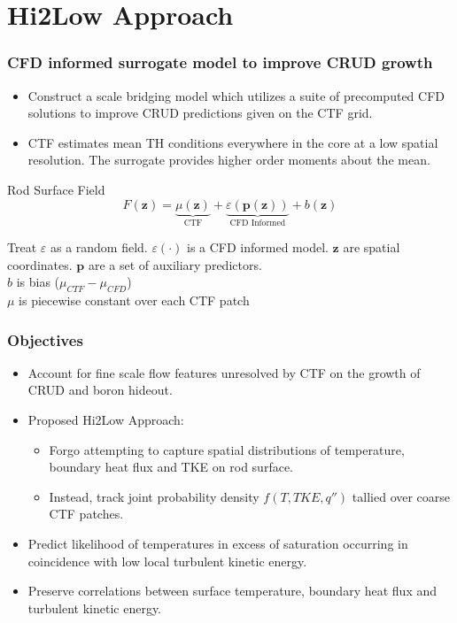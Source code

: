 \documentclass[t, pdftex]{beamer}
\begin{document}
\section{Hi2Low Approach}
\begin{frame}
    \frametitle{CFD informed surrogate model to improve CRUD growth}
    \begin{itemize}
    \item Construct a scale bridging model which utilizes a suite of precomputed CFD solutions to improve CRUD predictions given on the CTF grid. 
    \item CTF estimates mean TH conditions everywhere in the core at a low spatial resolution.  The surrogate provides higher order moments about the mean.
    \end{itemize}
    \begin{block}{Rod Surface Field}
        \[ 
        F(\mathbf z) = \underbrace{\mu(\mathbf{z})}_\text{CTF} + \underbrace{\varepsilon({\mathbf p(\mathbf z)})}_\text{CFD Informed} + b(\mathbf{z})
        \]
    \end{block}
    Treat $\varepsilon$ as a random field.  $\varepsilon(\cdot)$ is a CFD informed model. $\mathbf z$ are spatial coordinates. $\mathbf p$ are a set of auxiliary predictors. \\
    $b$ is bias ($\mu_{CTF} - \mu_{CFD}$) \\
    $\mu$ is piecewise constant over each CTF patch
\end{frame}

\begin{frame}\frametitle{Objectives}
\begin{itemize}
\item Account for fine scale flow features unresolved by CTF on the growth of CRUD and boron hideout.
\item Proposed Hi2Low Approach:
\begin{itemize}
	\item Forgo attempting to capture spatial distributions of temperature, boundary heat flux and TKE on rod surface. 
	\item Instead, track joint probability density $f(T, TKE, q'')$ tallied over coarse CTF patches.
\end{itemize}
	\item Predict likelihood of temperatures in excess of saturation occurring in coincidence with low local turbulent kinetic energy.
	\item Preserve correlations between surface temperature, boundary heat flux and turbulent kinetic energy.
\end{itemize}
\end{frame}
\end{document}
